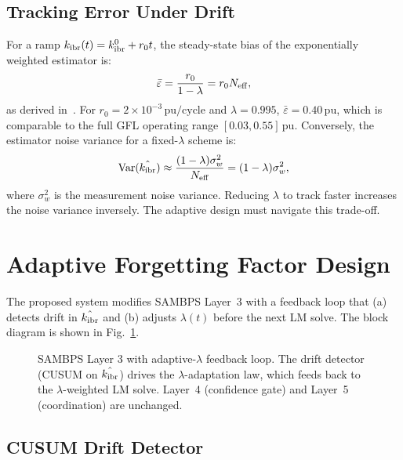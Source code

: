 \documentclass[journal]{IEEEtran}
\newcommand{\kibr}{k_{\rm ibr}}
\newcommand{\Neff}{N_{\rm eff}}
\begin{document}
\subsection{Tracking Error Under Drift}

For a ramp $\kibr(t) = \kibr^0 + r_0 t$, the steady-state bias of
the exponentially weighted estimator is:
\begin{equation}
  \bar{\varepsilon} = \frac{r_0}{1-\lambda} = r_0 \Neff,
  \label{eq:bias}
\end{equation}
as derived in~\cite{Ljung1999}.  For $r_0 = 2\times10^{-3}\,\text{pu/cycle}$
and $\lambda = 0.995$, $\bar{\varepsilon} = 0.40\,\text{pu}$, which is
comparable to the full GFL operating range $[0.03, 0.55]\,\text{pu}$.
Conversely, the estimator noise variance for a fixed-$\lambda$ scheme is:
\begin{equation}
  \mathrm{Var}(\hat{\kibr}) \approx \frac{(1-\lambda)\sigma_w^2}{\Neff}
  = (1-\lambda) \sigma_w^2,
  \label{eq:var}
\end{equation}
where $\sigma_w^2$ is the measurement noise variance.  Reducing
$\lambda$ to track faster increases the noise variance inversely.
The adaptive design must navigate this trade-off.

\section{Adaptive Forgetting Factor Design}
\label{sec:method}

The proposed system modifies SAMBPS Layer~3 with a feedback loop
that (a) detects drift in $\hat{\kibr}$ and (b) adjusts $\lambda(t)$
before the next LM solve.  The block diagram is shown in
Fig.~\ref{fig:block}.

\begin{figure}[htbp]
  \centering
  
  \caption{SAMBPS Layer 3 with adaptive-$\lambda$ feedback loop.
           The drift detector (CUSUM on $\hat{\kibr}$) drives the
           $\lambda$-adaptation law, which feeds back to the
           $\lambda$-weighted LM solve.  Layer~4 (confidence gate)
           and Layer~5 (coordination) are unchanged.}
  \label{fig:block}
\end{figure}

\subsection{CUSUM Drift Detector}
\end{document}
